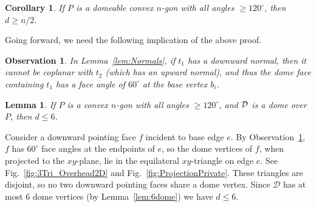 \documentclass[11pt]{article}
\newcommand{\ABox}{
\raisebox{3pt}{\framebox[6pt]{\rule{6pt}{0pt}}}
}
\newenvironment{proof}{{\bf Proof:}}{\hfill\ABox\medskip}
\newtheorem{corollary}[theorem]{Corollary}
\newtheorem{lemma}[theorem]{Lemma}
\newtheorem{obs}[theorem]{Observation}
\newcommand{\figref}[1]{\ref{fig:#1}}
\def\D{{\mathcal D}}
\begin{document}
\begin{corollary}
If $P$ is a domeable convex $n$-gon with all angles $\ge 120^\circ$, then $d \ge n/2$.    
\end{corollary}


Going forward, we need the following implication of the above proof.


\begin{obs} 
\label{obs:down-face}
In Lemma~\ref{lem:Normals}, if 
$t_1$ has a downward normal, then it cannot be coplanar with 
$t_2$
(which has an upward normal), and thus the 
dome face containing 
$t_1$ has a face angle of $60^\circ$ at the base vertex $b_i$.
\end{obs}


\begin{lemma}
\label{lem:d-le-6}
If $P$ is a convex $n$-gon with all angles $\ge 120^\circ$, and $\cal D$ is a dome over $P$, then $d \le 6$.
\end{lemma}
\begin{proof}
Consider a downward pointing face $f$ incident to base edge $e$. By Observation~\ref{obs:down-face}, $f$
has $60^\circ$ face angles at the endpoints of $e$, 
so the dome vertices of $f$, when projected to the $xy$-plane, lie in the equilateral $xy$-triangle on edge $e$.
See Fig.~\figref{3Tri_Overhead2D}
and Fig.~\figref{ProjectionPrivate}.
%
These triangles are disjoint, so 
no two downward pointing faces share a dome vertex.
Since $\D$ has
at most $6$ dome vertices (by Lemma~\ref{lem:6dome}) 
we have $d \le 6$.    
\end{proof}
\end{document}
